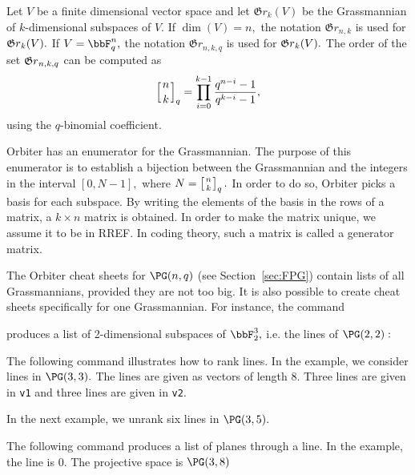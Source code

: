 Let $V$ be a finite dimensional vector space and 
let ${\mathfrak Gr}_k(V)$ be the Grassmannian 
of $k$-dimensional subspaces 
of $V.$ 
If $\dim(V) = n,$ the notation ${\mathfrak Gr}_{n,k}$ is used for ${\frak Gr}_k(V).$ 
If $V = \bbF_q^n,$ the notation ${\mathfrak Gr}_{n,k,q}$ 
is used for ${\frak Gr}_k(V).$ 
The order of the set ${\frak Gr}_{n,k,q}$ can be computed as
$$
\left[
n \atop k
\right]_q = 
\prod_{i=0}^{k-1}\frac{q^{n-i}-1}{q^{k-i}-1},
$$
using the $q$-binomial coefficient.

\bigskip

Orbiter has an enumerator for the Grassmannian. 
The purpose of this enumerator is to establish a bijection 
between the Grassmannian and the integers in the interval 
$
[0,N-1],
$ 
where $N = \left[
n \atop k
\right]_q.$
In order to do so, Orbiter picks a basis for each subspace. 
By writing the elements of the basis in 
the rows of a matrix, a $k\times n$ matrix is obtained. 
In order to make the matrix unique, we assume it to be in RREF. 
In coding theory, such a matrix is called a generator matrix.

\bigskip


The Orbiter cheat sheets for $\PG(n,q)$ 
(see Section~\ref{sec:FPG}) 
contain lists of all Grassmannians, provided they are not too big.
It is also possible to create cheat sheets specifically for one Grassmannian.
For instance, the command


produces a list of 2-dimensional 
subspaces of $\bbF_2^3,$ i.e. the lines of $\PG(2,2):$

\bigskip

The following command illustrates how to rank lines.
In the example, we consider lines in $\PG(3,3).$
The lines are given as vectors of length $8.$ 
Three lines are given in \verb'v1' 
and three lines are given in \verb'v2'.




\bigskip

In the next example, we unrank six lines in $\PG(3,5).$



\bigskip


The following command produces a list of planes through a line. 
In the example, the line is $0$. 
The projective space is $\PG(3,8)$





\bigskip




